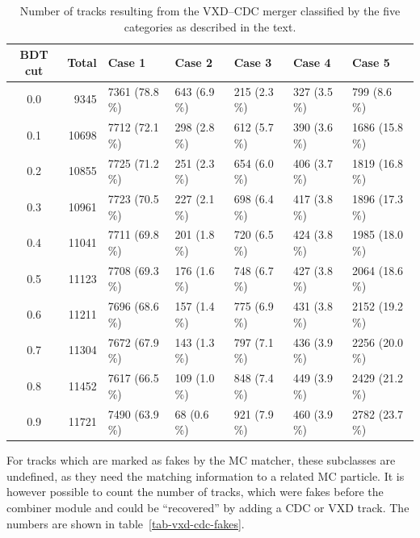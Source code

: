 \begin{table}
  \centering
  \caption{Number of tracks resulting from the VXD--CDC merger classified by the five categories as described in the text.}
  \begin{tabular}{crlllll}
    \toprule
    BDT cut &  Total &         Case 1 &       Case 2 &       Case 3 &       Case 4 &         Case 5 \\
    \midrule
	0.0 &   9345 &  7361 (78.8 \%) &  643 (6.9 \%) &  215 (2.3 \%) &  327 (3.5 \%) &    799 (8.6 \%) \\
	0.1 &  10698 &  7712 (72.1 \%) &  298 (2.8 \%) &  612 (5.7 \%) &  390 (3.6 \%) &  1686 (15.8 \%) \\
	0.2 &  10855 &  7725 (71.2 \%) &  251 (2.3 \%) &  654 (6.0 \%) &  406 (3.7 \%) &  1819 (16.8 \%) \\
	0.3 &  10961 &  7723 (70.5 \%) &  227 (2.1 \%) &  698 (6.4 \%) &  417 (3.8 \%) &  1896 (17.3 \%) \\
	0.4 &  11041 &  7711 (69.8 \%) &  201 (1.8 \%) &  720 (6.5 \%) &  424 (3.8 \%) &  1985 (18.0 \%) \\
	0.5 &  11123 &  7708 (69.3 \%) &  176 (1.6 \%) &  748 (6.7 \%) &  427 (3.8 \%) &  2064 (18.6 \%) \\
	0.6 &  11211 &  7696 (68.6 \%) &  157 (1.4 \%) &  775 (6.9 \%) &  431 (3.8 \%) &  2152 (19.2 \%) \\
	0.7 &  11304 &  7672 (67.9 \%) &  143 (1.3 \%) &  797 (7.1 \%) &  436 (3.9 \%) &  2256 (20.0 \%) \\
	0.8 &  11452 &  7617 (66.5 \%) &  109 (1.0 \%) &  848 (7.4 \%) &  449 (3.9 \%) &  2429 (21.2 \%) \\
	0.9 &  11721 &  7490 (63.9 \%) &   68 (0.6 \%) &  921 (7.9 \%) &  460 (3.9 \%) &  2782 (23.7 \%) \\
    \bottomrule
  \end{tabular}
  \label{tab-vxd-cdc-cases}
\end{table}

For tracks which are marked as fakes by the MC matcher, these subclasses are undefined, as they need the matching information to a related MC particle. It is however possible to count the number of tracks, which were fakes before the combiner module and could be ``recovered'' by adding a CDC or VXD track. The numbers are shown in table~\ref{tab-vxd-cdc-fakes}.


